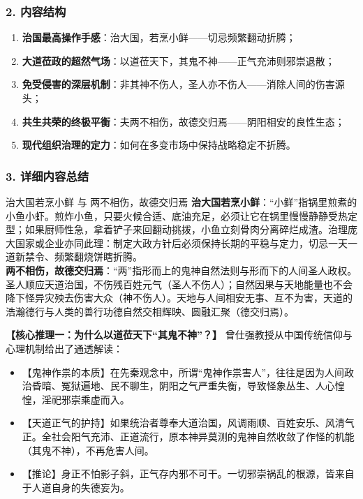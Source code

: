 \subsubsection{2. 内容结构}
\begin{enumerate}
    \item \textbf{治国最高操作手感}：治大国，若烹小鲜——切忌频繁翻动折腾；
    \item \textbf{大道莅政的超然气场}：以道莅天下，其鬼不神——正气充沛则邪崇退散；
    \item \textbf{免受侵害的深层机制}：非其神不伤人，圣人亦不伤人——消除人间的伤害源头；
    \item \textbf{共生共荣的终极平衡}：夫两不相伤，故德交归焉——阴阳相安的良性生态；
    \item \textbf{现代组织治理的定力}：如何在多变市场中保持战略稳定不折腾。
\end{enumerate}

\subsubsection{3. 详细内容总结}

\begin{ConceptBox}{治大国若烹小鲜 与 两不相伤，故德交归焉}
\textbf{治大国若烹小鲜}：“小鲜”指锅里煎煮的小鱼小虾。煎炸小鱼，只要火候合适、底油充足，必须让它在锅里慢慢静静受热定型；如果厨师性急，拿着铲子来回翻动挑拨，小鱼立刻骨肉分离碎烂成渣。治理庞大国家或企业亦同此理：制定大政方针后必须保持长期的平稳与定力，切忌一天一道新禁令、频繁翻烧饼瞎折腾。\\
\textbf{两不相伤，故德交归焉}：“两”指形而上的鬼神自然法则与形而下的人间圣人政权。圣人顺应天道治国，不伤残百姓元气（圣人不伤人）；自然因果与天地能量也不会降下怪异灾殃去伤害大众（神不伤人）。天地与人间相安无事、互不为害，天道的浩瀚德行与人类的善行功德自然交相辉映、圆融汇聚（德交归焉）。
\end{ConceptBox}

\noindent\textbf{【核心推理一：为什么以道莅天下“其鬼不神”？】}
曾仕强教授从中国传统信仰与心理机制给出了通透解读：
\begin{itemize}
    \item 【鬼神作祟的本质】在先秦观念中，所谓“鬼神作祟害人”，往往是因为人间政治昏暗、冤狱遍地、民不聊生，阴阳之气严重失衡，导致怪象丛生、人心惶惶，淫祀邪崇乘虚而入。
    \item 【天道正气的护持】如果统治者尊奉大道治国，风调雨顺、百姓安乐、风清气正。全社会阳气充沛、正道流行，原本神异莫测的鬼神自然收敛了作怪的机能（其鬼不神），不再危害人间。
    \item 【推论】身正不怕影子斜，正气存内邪不可干。一切邪崇祸乱的根源，皆来自于人道自身的失德妄为。
\end{itemize}

